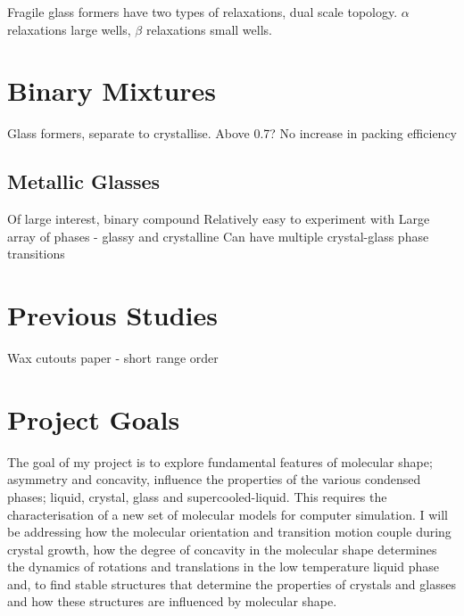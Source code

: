 Fragile glass formers have two types of relaxations, dual scale topology. $\alpha$ relaxations large wells, $\beta$ relaxations small wells.~\cite{stillinger:95}

\section{Binary Mixtures}
Glass formers, separate to crystallise. Above 0.7? No increase in packing efficiency

\subsection{Metallic Glasses}
Of large interest, binary compound
Relatively easy to experiment with
Large array of phases - glassy and crystalline
Can have multiple crystal-glass phase transitions



\section{Previous Studies}
Wax cutouts paper - short range order

\section{Project Goals}

The goal of my project is to explore fundamental features of molecular shape; asymmetry and concavity, influence the properties of the various condensed phases; liquid, crystal, glass and supercooled-liquid. This requires the characterisation of a new set of molecular models for computer simulation. I will be addressing how the molecular orientation and transition motion couple during crystal growth, how the degree of concavity in the molecular shape determines the dynamics of rotations and translations in the low temperature liquid phase and, to find stable structures that determine the properties of crystals and glasses and how these structures are influenced by molecular shape.


